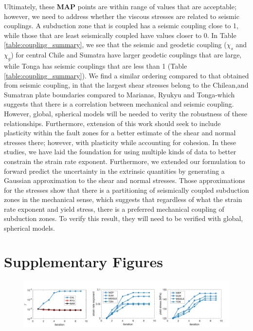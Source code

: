 \documentclass[12pt]{article}
\begin{document}
{   Ultimately, these \textbf{MAP} points are within range of values that are acceptable; however, we need to address whether the viscous stresses are related to seismic couplings. A subduction zone that is coupled has a seismic coupling close to 1, while those that are least seismically coupled have values closer to 0.  In Table \ref{table:coupling_summary}, we see that the seismic and geodetic coupling ($\chi_s$ and $\chi_g$) for central Chile and Sumatra have larger geodetic couplings that are large, while Tonga has seismic couplings that are less than 1 (Table \ref{table:coupling_summary}). We find a similar ordering compared to that obtained from seismic coupling, in that the largest shear stresses belong to the Chilean,and Sumatran plate boundaries compared to Marianas, Ryukyu and Tonga-which suggests that there is a correlation between mechanical and seismic coupling. However, global, spherical models will be needed to verity the robustness of these relationships. Furthermore, extension of this work should seek to include plasticity within the fault zones for a better estimate of the shear and normal stresses there; however, with plasticity while accounting for cohesion. In these studies, we have laid the foundation for using multiple kinds of data to better constrain the strain rate exponent. Furthermore, we extended our formulation to forward predict the uncertainty in the extrinsic quantities by generating a Gaussian approximation to the shear and normal stresses. Those approximations for the stresses show that there is a partitioning of seismically coupled subduction zones in the mechanical sense, which suggests that regardless of what the strain rate exponent and  yield stress, there is a preferred mechanical coupling of subduction zones. To verify this result, they will need to be verified with global, spherical models.








\appendix
\section{Supplementary Figures}
\begin{figure}[H]
\centering

\includegraphics[scale = 0.35]{supp.pdf}%


\end{figure}}
\end{document}
